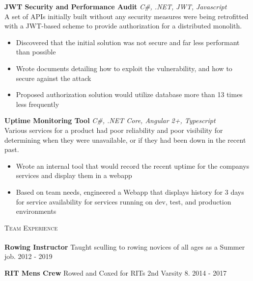 \documentclass[a4paper]{article}
\newcommand{\lineunder} {
    \vspace*{-8pt} \\
    \hspace*{-18pt} \hrulefill \\
}
\newcommand{\header} [1] {
    {\hspace*{-18pt}\vspace*{6pt} \textsc{#1}}
    \vspace*{-6pt} \lineunder
}
\begin{document}
\begin{addmargin}[1em]{2em}%
{\textbf{JWT Security and Performance Audit}} {\sl C\#, .NET, JWT, Javascript} \\
A set of APIs initially built without any security measures were being retrofitted with a JWT-based scheme to provide authorization for a distributed monolith.
\vspace*{-2mm}
\begin{itemize}[leftmargin=4.5mm] \itemsep -1mm
	\item Discovered that the initial solution was not secure and far less performant than possible
	\item Wrote documents detailing how to exploit the vulnerability, and how to secure against the attack%
    \item Proposed authorization solution would utilize database more than 13 times less frequently
\end{itemize}
\vspace*{2mm}

{\textbf{Uptime Monitoring Tool}} {\sl C\#, .NET Core, Angular 2+, Typescript} \\
Various services for a product had poor reliability and poor visibility for determining when they were unavailable, or if they had been down in the recent past.
\vspace*{-2mm}
\begin{itemize}[leftmargin=4.5mm] \itemsep -1mm 
	\item Wrote an internal tool that would record the recent uptime for the company\textquotesingle{}s services and display them in a webapp
    \item Based on team needs, engineered a Webapp that displays history for 3 days for service availability for services running on dev, test, and production environments
\end{itemize}
\vspace*{2mm}
\end{addmargin}


\header{Team Experience}
\textbf{Rowing Instructor}
Taught sculling to rowing novices of all ages as a Summer job. \hfill 2012 - 2019\\
\vspace*{2mm}

\textbf{RIT Men\textquotesingle{}s Crew}
Rowed and Coxed for RIT\textquotesingle{}s 2nd Varsity 8. \hfill  2014 - 2017\\
\vspace*{2mm}
\end{document}
